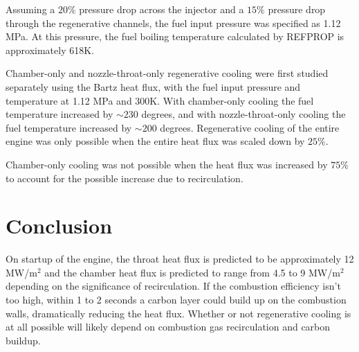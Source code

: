 \documentclass[11pt]{article}
\begin{document}
Assuming a $20\%$ pressure drop across the injector and a $15\%$ pressure drop through the regenerative channels, the fuel input pressure was specified as 1.12 MPa. At this pressure, the fuel boiling temperature calculated by REFPROP is approximately 618K.

Chamber-only and nozzle-throat-only regenerative cooling were first studied separately using the Bartz heat flux, with the fuel input pressure and temperature at 1.12 MPa and 300K. With chamber-only cooling the fuel temperature increased by $\sim 230$ degrees, and with nozzle-throat-only cooling the fuel temperature increased by $\sim 200$ degrees. Regenerative cooling of the entire engine was only possible when the entire heat flux was scaled down by $25\%$.

Chamber-only cooling was not possible when the heat flux was increased by $75\%$ to account for the possible increase due to recirculation.

\section{Conclusion}

On startup of the engine, the throat heat flux is predicted to be approximately 12 MW/m$^2$ and the chamber heat flux is predicted to range from 4.5 to 9 MW/m$^2$ depending on the significance of recirculation. If the combustion efficiency isn't too high, within 1 to 2 seconds a carbon layer could build up on the combustion walls, dramatically reducing the heat flux. Whether or not regenerative cooling is at all possible will likely depend on combustion gas recirculation and carbon buildup. 

\printbibliography
\end{document}

